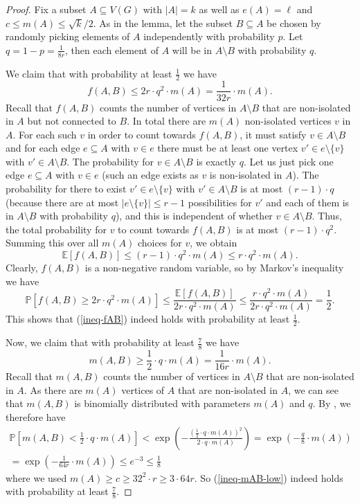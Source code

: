 \documentclass[11pt]{article}
\theoremstyle{definition}
\numberwithin{equation}{section}
\begin{document}
\begin{proof}Fix a subset $A\subseteq V(G)$ with $\vert A\vert=k$ as well as $e(A)=\ell$ and $c\leq m(A)\leq \sqrt{k}/2$. As in the lemma, let the subset $B\subseteq A$ be chosen by randomly picking elements of $A$ independently with probability $p$. Let $q=1-p=\frac{1}{8r}$, then each element of $A$ will be in $A\setminus B$ with probability $q$.

We claim that with probability at least $\frac{1}{2}$ we have
\begin{equation}\label{ineq-fAB}
f(A,B)\leq 2r\cdot q^2 \cdot m(A)=\frac{1}{32r}\cdot m(A).
\end{equation}
Recall that $f(A,B)$ counts the number of vertices in $A\setminus B$ that are non-isolated in $A$ but not connected to $B$. In total there are $m(A)$ non-isolated vertices $v$ in $A$. For each such $v$ in order to count towards $f(A,B)$, it must satisfy $v\in A\setminus B$ and for each edge $e\subseteq A$ with $v\in e$ there must be at least one vertex $v'\in e\setminus \lbrace v\rbrace$ with $v'\in A\setminus B$. The probability for $v\in A\setminus B$ is exactly $q$. Let us just pick one edge $e\subseteq A$ with $v\in e$ (such an edge exists as $v$ is non-isolated in $A$). The probability for there to exist $v'\in e\setminus \lbrace v\rbrace$ with $v'\in A\setminus B$ is at most $(r-1)\cdot q$ (because there are at most $\vert e\setminus \lbrace v\rbrace\vert\leq r-1$ possibilities for $v'$ and each of them is in $A\setminus B$ with probability $q$), and this is independent of whether $v\in A\setminus B$. Thus, the total probability for $v$ to count towards $f(A,B)$ is at most $(r-1)\cdot q^2$. Summing this over all $m(A)$ choices for $v$, we obtain
\[\mathbb{E}[f(A,B)]\leq (r-1)\cdot q^2\cdot m(A)\leq r\cdot q^2\cdot m(A).\]
Clearly, $f(A,B)$ is a non-negative random variable, so by Markov's inequality we have
\[\mathbb{P}[f(A,B)\geq 2r\cdot q^2\cdot m(A)]\leq \frac{\mathbb{E}[f(A,B)]}{2r\cdot q^2\cdot m(A)}\leq \frac{r\cdot q^2\cdot m(A)}{2r\cdot q^2\cdot m(A)}=\frac{1}{2}.\]
This shows that (\ref{ineq-fAB}) indeed holds with probability at least $\frac{1}{2}$.

Now, we claim that with probability at least $\frac{7}{8}$ we have
\begin{equation}\label{ineq-mAB-low}
m(A,B)\geq \frac{1}{2}\cdot q \cdot m(A)=\frac{1}{16r}\cdot m(A).
\end{equation}
Recall that $m(A,B)$ counts the number of vertices in $A\setminus B$ that are non-isolated in $A$. As there are $m(A)$ vertices of $A$ that are non-isolated in $A$, we can see that $m(A,B)$ is binomially distributed with parameters $m(A)$ and $q$. By \cite[Theorem A.1.13]{alon-spencer}, we therefore have 
\begin{multline*}
\mathbb{P}\left[m(A,B)< \frac{1}{2}\cdot q \cdot m(A)\right]<\exp\left(-\frac{\left(\frac{1}{2}\cdot q \cdot m(A)\right)^2}{2\cdot q\cdot m(A)}\right)=\exp\left(-\frac{q}{8}\cdot m(A)\right)\\
=\exp\left(-\frac{1}{64r}\cdot m(A)\right)\leq e^{-3}\leq \frac{1}{8}
\end{multline*}
where we used $m(A)\geq c\geq 32^2\cdot r\geq3\cdot  64r$. So (\ref{ineq-mAB-low}) indeed holds with probability at least $\frac{7}{8}$.


\end{proof}
\end{document}

